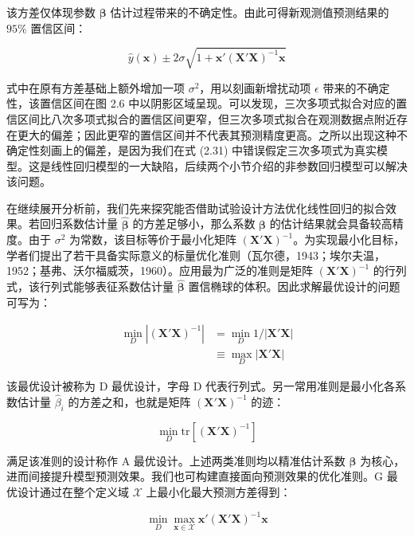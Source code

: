 \documentclass{ctexart}
\begin{document}
该方差仅体现参数 $\boldsymbol{\beta}$ 估计过程带来的不确定性。由此可得新观测值预测结果的 $95\%$ 置信区间：

\begin{equation*}
\widehat{y}(\boldsymbol{x})\pm 2\sigma\sqrt{1+\boldsymbol{x}'(\boldsymbol{X}'\boldsymbol{X})^{-1}\boldsymbol{x}}
\end{equation*}

式中在原有方差基础上额外增加一项 $\sigma^2$，用以刻画新增扰动项 $\epsilon$ 带来的不确定性，该置信区间在图 2.6 中以阴影区域呈现。可以发现，三次多项式拟合对应的置信区间比八次多项式拟合的置信区间更窄，但三次多项式拟合在观测数据点附近存在更大的偏差；因此更窄的置信区间并不代表其预测精度更高。之所以出现这种不确定性刻画上的偏差，是因为我们在式 (2.31) 中错误假定三次多项式为真实模型。这是线性回归模型的一大缺陷，后续两个小节介绍的非参数回归模型可以解决该问题。

在继续展开分析前，我们先来探究能否借助试验设计方法优化线性回归的拟合效果。若回归系数估计量 $\widehat{\boldsymbol{\beta}}$ 的方差足够小，那么系数 $\boldsymbol{\beta}$ 的估计结果就会具备较高精度。由于 $\sigma^2$ 为常数，该目标等价于最小化矩阵 $(\boldsymbol{X}'\boldsymbol{X})^{-1}$。为实现最小化目标，学者们提出了若干具备实际意义的标量优化准则（瓦尔德，1943；埃尔夫温，1952；基弗、沃尔福威茨，1960）。应用最为广泛的准则是矩阵 $(\boldsymbol{X}'\boldsymbol{X})^{-1}$ 的行列式，该行列式能够表征系数估计量 $\widehat{\boldsymbol{\beta}}$ 置信椭球的体积。因此求解最优设计的问题可写为：

\begin{align*}
\min_D|(\boldsymbol{X}'\boldsymbol{X})^{-1}|&=\min_D1/|\boldsymbol{X}'\boldsymbol{X}|\\
&\equiv\max_D|\boldsymbol{X}'\boldsymbol{X}|
\tag{2.34}
\end{align*}

该最优设计被称为 D 最优设计，字母 D 代表行列式。另一常用准则是最小化各系数估计量 $\widehat{\beta}_i$ 的方差之和，也就是矩阵 $(\boldsymbol{X}'\boldsymbol{X})^{-1}$ 的迹：

\begin{equation*}
\min_D\mathrm{tr}\left[(\boldsymbol{X}'\boldsymbol{X})^{-1}\right]
\tag{2.35}
\end{equation*}

满足该准则的设计称作 A 最优设计。上述两类准则均以精准估计系数 $\boldsymbol{\beta}$ 为核心，进而间接提升模型预测效果。我们也可构建直接面向预测效果的优化准则。G 最优设计通过在整个定义域 $\mathcal{X}$ 上最小化最大预测方差得到：

\begin{equation*}
\min_D\max_{\boldsymbol{x}\in\mathcal{X}}\boldsymbol{x}'(\boldsymbol{X}'\boldsymbol{X})^{-1}\boldsymbol{x}
\tag{2.36}
\end{equation*}
\end{document}
